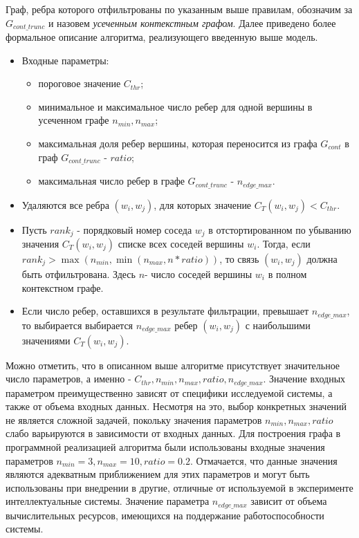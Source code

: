 Граф, ребра которого отфильтрованы по указанным выше правилам, обозначим за $G_{cont\_trunc}$ и назовем \emph{усеченным контекстным графом}. Далее приведено более формальное описание алгоритма, реализующего введенную выше модель.

\begin{itemize}
    \item Входные параметры:
        \begin{itemize}
            \item пороговое значение $C_{thr}$;
            \item минимальное и максимальное число ребер для одной вершины в усеченном графе $n_{min}, n_{max}$;
            \item максимальная доля ребер вершины, которая переносится из графа $G_{cont}$ в граф $G_{cont\_trunc}$ - $ratio$;
            \item максимальная число ребер в графе $G_{cont\_trunc}$ - $n_{edge\_max}$.
        \end{itemize}
    \item Удаляются все ребра $(w_i, w_j)$, для которых значение $C_{T}(w_i, w_j) < C_{thr}$.
    \item Пусть $rank_j$ - порядковый номер соседа $w_j$ в отстортированном по убыванию значения $C_{T}(w_i,w_j)$ списке всех соседей вершины $w_i$. Тогда, если $rank_j > \max(n_{min},\min(n_{max},n * ratio))$, то связь $(w_i,w_j)$ должна быть отфильтрована. Здесь $n$- число соседей вершины $w_i$ в полном контекстном графе.
    \item Если число ребер, оставшихся в результате фильтрации, превышает $n_{edge\_max}$, то выбирается выбирается $n_{edge\_max}$ ребер $(w_i, w_j)$ с наибольшими значениями $C_T(w_i, w_j)$.
\end{itemize}

Можно отметить, что в описанном выше алгоритме присутствует значительное число параметров, а именно - $C_{thr}, n_{min}, n_{max}, ratio, n_{edge\_max}$. Значение входных параметром преимущественно зависят от специфики исследуемой системы, а также от объема входных данных. Несмотря на это, выбор конкретных значений не является сложной задачей, покольку значения параметров $n_{min}, n_{max}, ratio$ слабо варьируются в зависимости от входных данных. Для построения графа в программной реализацией алгоритма были использованы входные значения параметров $n_{min} = 3, n_{max} = 10, ratio=0.2$. Отмачается, что данные значения являются адекватным приближением для этих параметров и могут быть использованы при внедрении в другие, отличные от используемой в эксперименте интеллектуальные системы. Значение параметра $n_{edge\_max}$ зависит от объема вычислительных ресурсов, имеющихся на поддержание работоспособности системы. 

